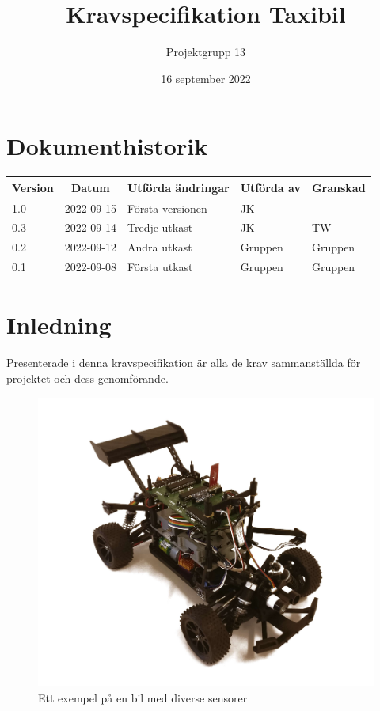 \documentclass[10pt,oneside,swedish]{../lips}
\title{Kravspecifikation Taxibil}
\author{Projektgrupp 13}
\date{16 september 2022}
\begin{document}


\cleardoublepage
\tableofcontents

\cleardoublepage
\section*{Dokumenthistorik}
\begin{tabular}{p{}|p{}|p{}|p{}|p{}} 
  \multicolumn{1}{c}{\bfseries Version} & 
  \multicolumn{1}{|c}{\bfseries Datum} & 
  \multicolumn{1}{|c}{\bfseries Utförda ändringar} & 
  \multicolumn{1}{|c}{\bfseries Utförda av} & 
  \multicolumn{1}{|c}{\bfseries Granskad}\\
  \hline
  \hline
  1.0 & 2022-09-15 & Första versionen & JK &    \\
  \hline
  0.3 & 2022-09-14 & Tredje utkast & JK & TW \\
  \hline
  0.2 & 2022-09-12 & Andra utkast & Gruppen & Gruppen \\
  \hline
  0.1 & 2022-09-08 & Första utkast & Gruppen & Gruppen \\
  \hline
\end{tabular}

\cleardoublepage
{}\cfoot{\thepage}

\section{Inledning}
\label{sec:inledning}

Presenterade i denna kravspecifikation är alla de krav sammanställda för projektet och dess genomförande.

\begin{figure}[htbp]
  \centering
  \includegraphics[width=.7\textwidth]{../Figures/exempelbil}
  \caption{Ett exempel på en bil med diverse sensorer}
  \label{fig:bil}
\end{figure}\textbf{}
\end{document}
